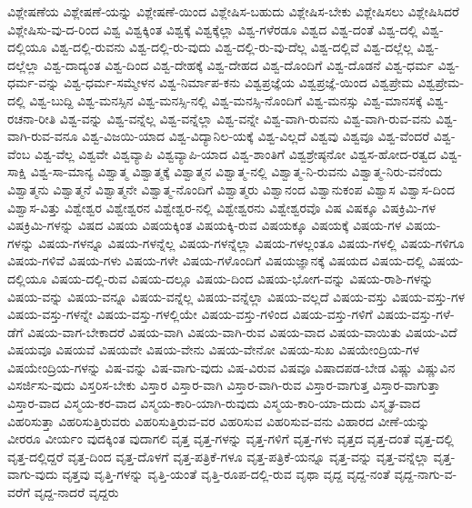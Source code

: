 {ವಿಶ್ಲೇಷಣೆಯ
ವಿಶ್ಲೇಷಣೆ-ಯನ್ನು
ವಿಶ್ಲೇಷಣೆ-ಯಿಂದ
ವಿಶ್ಲೇಷಿಸ-ಬಹುದು
ವಿಶ್ಲೇಷಿಸ-ಬೇಕು
ವಿಶ್ಲೇಷಿಸಲು
ವಿಶ್ಲೇಷಿಸಿದರೆ
ವಿಶ್ಲೇಷಿಸು-ವು-ದ-ರಿಂದ
ವಿಶ್ವ
ವಿಶ್ವಕ್ಕಿಂತ
ವಿಶ್ವಕ್ಕೆ
ವಿಶ್ವಕ್ಕೆಲ್ಲಾ
ವಿಶ್ವ-ಗಳೆರಡೂ
ವಿಶ್ವದ
ವಿಶ್ವ-ದಂತೆ
ವಿಶ್ವ-ದಲ್ಲಿ
ವಿಶ್ವ-ದಲ್ಲಿಯೂ
ವಿಶ್ವ-ದಲ್ಲಿ-ರುವನು
ವಿಶ್ವ-ದಲ್ಲಿ-ರು-ವುದು
ವಿಶ್ವ-ದಲ್ಲಿ-ರು-ವು-ದೆಲ್ಲ
ವಿಶ್ವ-ದಲ್ಲಿವೆ
ವಿಶ್ವ-ದಲ್ಲೆಲ್ಲ
ವಿಶ್ವ-ದಲ್ಲೆಲ್ಲಾ
ವಿಶ್ವ-ದಾದ್ಯಂತ
ವಿಶ್ವ-ದಿಂದ
ವಿಶ್ವ-ದೇಹಕ್ಕೆ
ವಿಶ್ವ-ದೇಹದ
ವಿಶ್ವ-ದೊಂದಿಗೆ
ವಿಶ್ವ-ದೊಡನೆ
ವಿಶ್ವ-ಧರ್ಮ
ವಿಶ್ವ-ಧರ್ಮ-ವನ್ನು
ವಿಶ್ವ-ಧರ್ಮ-ಸಮ್ಮೇಳನ
ವಿಶ್ವ-ನಿರ್ಮಾಪ-ಕನು
ವಿಶ್ವಪ್ರಜ್ಞೆಯ
ವಿಶ್ವಪ್ರಜ್ಞೆ-ಯಿಂದ
ವಿಶ್ವಪ್ರೇಮ
ವಿಶ್ವಪ್ರೇಮ-ದಲ್ಲಿ
ವಿಶ್ವ-ಬುದ್ದಿ
ವಿಶ್ವ-ಮನಸ್ಸಿನ
ವಿಶ್ವ-ಮನಸ್ಸಿ-ನಲ್ಲಿ
ವಿಶ್ವ-ಮನಸ್ಸಿ-ನೊಂದಿಗೆ
ವಿಶ್ವ-ಮನಸ್ಸು
ವಿಶ್ವ-ಮಾನಸಕ್ಕೆ
ವಿಶ್ವ-ರಚನಾ-ರೀತಿ
ವಿಶ್ವ-ವನ್ನು
ವಿಶ್ವ-ವನ್ನೆಲ್ಲ
ವಿಶ್ವ-ವನ್ನೆಲ್ಲಾ
ವಿಶ್ವ-ವನ್ನೇ
ವಿಶ್ವ-ವಾಗಿ-ರುವನು
ವಿಶ್ವ-ವಾಗಿ-ರುವ-ವನು
ವಿಶ್ವ-ವಾಗಿ-ರುವ-ವನೂ
ವಿಶ್ವ-ವಿಜಯಿ-ಯಾದ
ವಿಶ್ವ-ವಿದ್ಯಾನಿಲ-ಯಕ್ಕೆ
ವಿಶ್ವ-ವಿಲ್ಲದೆ
ವಿಶ್ವವು
ವಿಶ್ವವೂ
ವಿಶ್ವ-ವೆಂದರೆ
ವಿಶ್ವ-ವೆಂಬ
ವಿಶ್ವ-ವೆಲ್ಲ
ವಿಶ್ವವೇ
ವಿಶ್ವವ್ಯಾಪಿ
ವಿಶ್ವವ್ಯಾಪಿ-ಯಾದ
ವಿಶ್ವ-ಶಾಂತಿಗೆ
ವಿಶ್ವಶ್ರೇಷ್ಠನೋ
ವಿಶ್ವಸ-ಹೋದ-ರತ್ವದ
ವಿಶ್ವ-ಸಾಕ್ಷಿ
ವಿಶ್ವ-ಸಾ-ಮಾನ್ಯ
ವಿಶ್ವಾತ್ಮ
ವಿಶ್ವಾತ್ಮಕ್ಕೆ
ವಿಶ್ವಾತ್ಮನ
ವಿಶ್ವಾತ್ಮ-ನಲ್ಲಿ
ವಿಶ್ವಾತ್ಮ-ನಿ-ರುವನು
ವಿಶ್ವಾತ್ಮ-ನಿರು-ವನೆಂದು
ವಿಶ್ವಾತ್ಮನು
ವಿಶ್ವಾತ್ಮನೆ
ವಿಶ್ವಾತ್ಮನೇ
ವಿಶ್ವಾತ್ಮ-ನೊಂದಿಗೆ
ವಿಶ್ವಾತ್ಮರು
ವಿಶ್ವಾನಂದ
ವಿಶ್ವಾನುಕಂಪ
ವಿಶ್ವಾಸ
ವಿಶ್ವಾಸ-ದಿಂದ
ವಿಶ್ವಾಸ-ವಿತ್ತು
ವಿಶ್ವೇಶ್ವರ
ವಿಶ್ವೇಶ್ವರನ
ವಿಶ್ವೇಶ್ವರ-ನಲ್ಲಿ
ವಿಶ್ವೇಶ್ವರನು
ವಿಶ್ವೇಶ್ವರವೊ
ವಿಷ
ವಿಷಕ್ಕೂ
ವಿಷಕ್ರಿಮಿ-ಗಳ
ವಿಷಕ್ರಿಮಿ-ಗಳನ್ನು
ವಿಷದ
ವಿಷಯ
ವಿಷಯಕ್ಕಿಂತ
ವಿಷಯಕ್ಕಿ-ರುವ
ವಿಷಯಕ್ಕೂ
ವಿಷಯಕ್ಕೆ
ವಿಷಯ-ಗಳ
ವಿಷಯ-ಗಳನ್ನು
ವಿಷಯ-ಗಳನ್ನೂ
ವಿಷಯ-ಗಳನ್ನೆಲ್ಲ
ವಿಷಯ-ಗಳನ್ನೆಲ್ಲಾ
ವಿಷಯ-ಗಳಲ್ಲಂತೂ
ವಿಷಯ-ಗಳಲ್ಲಿ
ವಿಷಯ-ಗಳಿಗೂ
ವಿಷಯ-ಗಳಿವೆ
ವಿಷಯ-ಗಳು
ವಿಷಯ-ಗಳೇ
ವಿಷಯ-ಗಳೊಂದಿಗೆ
ವಿಷಯಜ್ಞಾನಕ್ಕೆ
ವಿಷಯದ
ವಿಷಯ-ದಲ್ಲಿ
ವಿಷಯ-ದಲ್ಲಿಯೂ
ವಿಷಯ-ದಲ್ಲಿ-ರುವ
ವಿಷಯ-ದಲ್ಲೂ
ವಿಷಯ-ದಿಂದ
ವಿಷಯ-ಭೋಗ-ವನ್ನು
ವಿಷಯ-ರಾಶಿ-ಗಳನ್ನು
ವಿಷಯ-ವನ್ನು
ವಿಷಯ-ವನ್ನೂ
ವಿಷಯ-ವನ್ನೆಲ್ಲ
ವಿಷಯ-ವನ್ನೆಲ್ಲಾ
ವಿಷಯ-ವಲ್ಲದೆ
ವಿಷಯ-ವಸ್ತು
ವಿಷಯ-ವಸ್ತು-ಗಳ
ವಿಷಯ-ವಸ್ತು-ಗಳನ್ನೇ
ವಿಷಯ-ವಸ್ತು-ಗಳಲ್ಲಿಯೇ
ವಿಷಯ-ವಸ್ತು-ಗಳಿಂದ
ವಿಷಯ-ವಸ್ತು-ಗಳಿಗೆ
ವಿಷಯ-ವಸ್ತು-ಗಳೆ-ಡೆಗೆ
ವಿಷಯ-ವಾಗ-ಬೇಕಾದರೆ
ವಿಷಯ-ವಾಗಿ
ವಿಷಯ-ವಾಗಿ-ರುವ
ವಿಷಯ-ವಾದ
ವಿಷಯ-ವಾಯಿತು
ವಿಷಯ-ವಿದೆ
ವಿಷಯವೂ
ವಿಷಯವೆ
ವಿಷಯವೇ
ವಿಷಯ-ವೇನು
ವಿಷಯ-ವೇನೋ
ವಿಷಯ-ಸುಖ
ವಿಷಯೇಂದ್ರಿಯ-ಗಳ
ವಿಷಯೇಂದ್ರಿಯ-ಗಳನ್ನು
ವಿಷ-ವನ್ನು
ವಿಷ-ವಾಗು-ವುದು
ವಿಷ-ವಿರುವ
ವಿಷವೂ
ವಿಷಾದಪಡ-ಬೇಡ
ವಿಷ್ಣು
ವಿಷ್ಣುವಿನ
ವಿಸರ್ಜಿಸು-ವುದು
ವಿಸ್ತರಿಸ-ಬೇಕು
ವಿಸ್ತಾರ
ವಿಸ್ತಾರ-ವಾಗಿ
ವಿಸ್ತಾರ-ವಾಗಿ-ರುವ
ವಿಸ್ತಾರ-ವಾಗುತ್ತ
ವಿಸ್ತಾರ-ವಾಗುತ್ತಾ
ವಿಸ್ತಾರ-ವಾದ
ವಿಸ್ಮಯ-ಕರ-ವಾದ
ವಿಸ್ಮಯ-ಕಾರಿ-ಯಾಗಿ-ರುವುದು
ವಿಸ್ಮಯ-ಕಾರಿ-ಯಾ-ದುದು
ವಿಸ್ಮೃತ-ವಾದ
ವಿಹರಿಸುತ್ತಾ
ವಿಹರಿಸುತ್ತಿರುವರು
ವಿಹರಿಸುತ್ತಿರುವ-ವರ
ವಿಹರಿಸುವ
ವಿಹರಿಸುವ-ವನು
ವಿಹಾರದ
ವೀಣೆ-ಯನ್ನು
ವೀರರೂ
ವೀರ್ಯಂ
ವುದಕ್ಕಿಂತ
ವುದಾಗಲಿ
ವೃತ್ತ
ವೃತ್ತ-ಗಳನ್ನು
ವೃತ್ತ-ಗಳಿಗೆ
ವೃತ್ತ-ಗಳು
ವೃತ್ತದ
ವೃತ್ತ-ದಂತೆ
ವೃತ್ತ-ದಲ್ಲಿ
ವೃತ್ತ-ದಲ್ಲಿದ್ದರೆ
ವೃತ್ತ-ದಿಂದ
ವೃತ್ತ-ದೊಳಗೆ
ವೃತ್ತ-ಪತ್ರಿಕೆ-ಗಳೂ
ವೃತ್ತ-ಪತ್ರಿಕೆ-ಯನ್ನೂ
ವೃತ್ತ-ವನ್ನು
ವೃತ್ತ-ವನ್ನೆಲ್ಲಾ
ವೃತ್ತ-ವಾಗು-ವುದು
ವೃತ್ತವು
ವೃತ್ತಿ-ಗಳನ್ನು
ವೃತ್ತಿ-ಯಂತೆ
ವೃತ್ತಿ-ರೂಪ-ದಲ್ಲಿ-ರುವ
ವೃಥಾ
ವೃದ್ದ
ವೃದ್ದ-ನಂತೆ
ವೃದ್ದ-ನಾಗು-ವ-ವರೆಗೆ
ವೃದ್ದ-ನಾದರೆ
ವೃದ್ದರು
}
